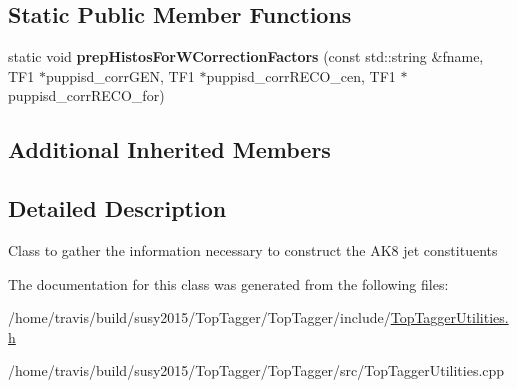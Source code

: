 \subsection*{Static Public Member Functions}
\begin{DoxyCompactItemize}
\item 
\hypertarget{classttUtility_1_1ConstAK8Inputs_a9f18c082d4f1a3f031b1b99ed0ab775f}{static void {\bfseries prep\-Histos\-For\-W\-Correction\-Factors} (const std\-::string \&fname, T\-F1 $\ast$puppisd\-\_\-corr\-G\-E\-N, T\-F1 $\ast$puppisd\-\_\-corr\-R\-E\-C\-O\-\_\-cen, T\-F1 $\ast$puppisd\-\_\-corr\-R\-E\-C\-O\-\_\-for)}\label{classttUtility_1_1ConstAK8Inputs_a9f18c082d4f1a3f031b1b99ed0ab775f}

\end{DoxyCompactItemize}
\subsection*{Additional Inherited Members}


\subsection{Detailed Description}
Class to gather the information necessary to construct the A\-K8 jet constituents 

The documentation for this class was generated from the following files\-:\begin{DoxyCompactItemize}
\item 
/home/travis/build/susy2015/\-Top\-Tagger/\-Top\-Tagger/include/\hyperlink{TopTaggerUtilities_8h}{Top\-Tagger\-Utilities.\-h}\item 
/home/travis/build/susy2015/\-Top\-Tagger/\-Top\-Tagger/src/Top\-Tagger\-Utilities.\-cpp\end{DoxyCompactItemize}
